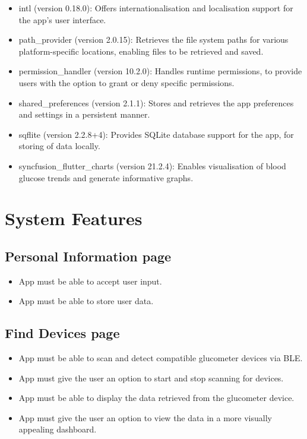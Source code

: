 \documentclass[a4paper]{scrreprt}
\begin{document}
\begin{itemize}
\begin{itemize}
        \item intl (version 0.18.0): Offers internationalisation and localisation support for the app's user interface.
        \item path\_provider (version 2.0.15): Retrieves the file system paths for various platform-specific locations, enabling files to be retrieved and saved.
        \item permission\_handler (version 10.2.0): Handles runtime permissions, to provide users with the option to grant or deny specific permissions.
        \item shared\_preferences (version 2.1.1): Stores and retrieves the app preferences and settings in a persistent manner.
        \item sqflite (version 2.2.8+4): Provides SQLite database support for the app, for storing of data locally.
        \item syncfusion\_flutter\_charts (version 21.2.4): Enables visualisation of blood glucose trends and generate informative graphs.
    \end{itemize}
\end{itemize}

\chapter{System Features}

\section{Personal Information page}
\begin{itemize}
    \item App must be able to accept user input.
    \item App must be able to store user data.
\end{itemize}
\section{Find Devices page}
\begin{itemize}
    \item App must be able to scan and detect compatible glucometer devices via BLE.
    \item App must give the user an option to start and stop scanning for devices.
    \item App must be able to display the data retrieved from the glucometer device.
    \item App must give the user an option to view the data in a more visually appealing dashboard.
\end{itemize}
\end{document}
